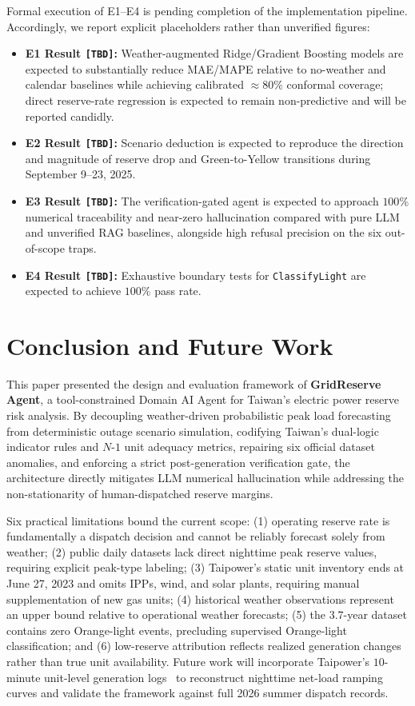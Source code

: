 \documentclass[conference]{IEEEtran}
\begin{document}
Formal execution of E1--E4 is pending completion of the implementation pipeline. Accordingly, we report explicit placeholders rather than unverified figures:
\begin{itemize}
    \item \textbf{E1 Result \texttt{[TBD]}:} Weather-augmented Ridge/Gradient Boosting models are expected to substantially reduce MAE/MAPE relative to no-weather and calendar baselines while achieving calibrated $\approx 80\%$ conformal coverage; direct reserve-rate regression is expected to remain non-predictive and will be reported candidly.
    \item \textbf{E2 Result \texttt{[TBD]}:} Scenario deduction is expected to reproduce the direction and magnitude of reserve drop and Green-to-Yellow transitions during September 9--23, 2025.
    \item \textbf{E3 Result \texttt{[TBD]}:} The verification-gated agent is expected to approach $100\%$ numerical traceability and near-zero hallucination compared with pure LLM and unverified RAG baselines, alongside high refusal precision on the six out-of-scope traps.
    \item \textbf{E4 Result \texttt{[TBD]}:} Exhaustive boundary tests for \texttt{ClassifyLight} are expected to achieve $100\%$ pass rate.
\end{itemize}

\section{Conclusion and Future Work}
\label{sec:conclusion}

This paper presented the design and evaluation framework of \textbf{GridReserve Agent}, a tool-constrained Domain AI Agent for Taiwan's electric power reserve risk analysis. By decoupling weather-driven probabilistic peak load forecasting from deterministic outage scenario simulation, codifying Taiwan's dual-logic indicator rules and $N\text{-}1$ unit adequacy metrics, repairing six official dataset anomalies, and enforcing a strict post-generation verification gate, the architecture directly mitigates LLM numerical hallucination while addressing the non-stationarity of human-dispatched reserve margins.

Six practical limitations bound the current scope: (1) operating reserve rate is fundamentally a dispatch decision and cannot be reliably forecast solely from weather; (2) public daily datasets lack direct nighttime peak reserve values, requiring explicit peak-type labeling; (3) Taipower's static unit inventory ends at June 27, 2023 and omits IPPs, wind, and solar plants, requiring manual supplementation of new gas units; (4) historical weather observations represent an upper bound relative to operational weather forecasts; (5) the $3.7$-year dataset contains zero Orange-light events, precluding supervised Orange-light classification; and (6) low-reserve attribution reflects realized generation changes rather than true unit availability. Future work will incorporate Taipower's $10$-minute unit-level generation logs~\cite{ref30} to reconstruct nighttime net-load ramping curves and validate the framework against full 2026 summer dispatch records.
\end{document}
